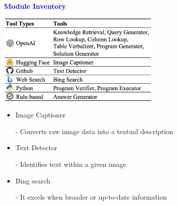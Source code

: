\documentclass[professionalfont]{beamer}
\begin{document}
\begin{frame}

\begin{center}
    { \textbf{\textcolor{blue}{ {\fontsize{12}{14}\selectfont Module Inventory} }} }
\end{center}

\begin{center}
    \includegraphics[width=0.6\textwidth]{table/2.png}
\end{center}

\begin{itemize}
    \item Image Captioner

    - Converts raw image data into a textual description

    \item Text Detector

    - Identifies text within a given image

    \item Bing search

    - It excels when broader or up-to-date information
\end{itemize}

\end{frame}
\end{document}
